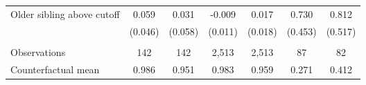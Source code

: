 {{\begin{tabular}{lcccccc}
Older sibling above cutoff&       0.059   &       0.031   &      -0.009   &       0.017   &       0.730   &       0.812   \\
                    &     (0.046)   &     (0.058)   &     (0.011)   &     (0.018)   &     (0.453)   &     (0.517)   \\
                    &               &               &               &               &               &               \\
Observations        &         142   &         142   &       2,513   &       2,513   &          87   &          82   \\
Counterfactual mean &       0.986   &       0.951   &       0.983   &       0.959   &       0.271   &       0.412   \\
 

\bottomrule
\end{tabular}
}
}

